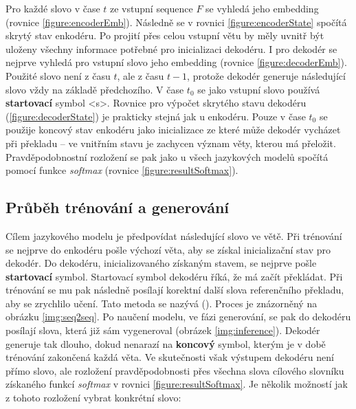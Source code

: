 Pro každé slovo v čase $t$ ze vstupní sequence $F$ se vyhledá jeho embedding (rovnice \ref{figure:encoderEmb}). Následně se v rovnici \ref{figure:encoderState} spočítá skrytý stav enkodéru. Po projití přes celou vstupní větu by měly uvnitř být uloženy všechny informace potřebné pro inicializaci dekodéru. I pro dekodér se nejprve vyhledá pro vstupní slovo jeho embedding (rovnice \ref{figure:decoderEmb}). Použité slovo není z času $t$, ale z času $t-1$, protože dekodér generuje následující slovo vždy na základě předchozího. V čase $t_0$ se jako vstupní slovo používá \textbf{startovací} symbol <s>. Rovnice pro výpočet skrytého stavu dekodéru (\ref{figure:decoderState}) je prakticky stejná jak u enkodéru. Pouze v čase $t_0$ se použije koncový stav enkodéru jako inicializace ze které může dekodér vycházet při překladu -- ve vnitřním stavu je zachycen význam věty, kterou má přeložit. Pravděpodobnostní rozložení se pak jako u všech jazykových modelů spočítá pomocí funkce \emph{softmax} (rovnice \ref{figure:resultSoftmax}).


\subsection{Průběh trénování a generování}

Cílem jazykového modelu je předpovídat následující slovo ve větě. Při trénování se nejprve do enkodéru pošle výchozí věta, aby se získal inicializační stav pro dekodér. Do dekodéru, inicializovaného získaným stavem, se nejprve pošle \textbf{startovací} symbol. Startovací symbol dekodéru říká, že má začít překládat. Při trénování se mu pak následně posílají korektní další slova referenčního překladu, aby se zrychlilo učení. Tato metoda se nazývá \label{teacherForcing} (\cite{teacherForcing}). Proces je znázorněný na obrázku \ref{img:seq2seq}. Po naučení modelu, ve fázi generování, se pak do dekodéru posílají slova, která již sám vygeneroval (obrázek \ref{img:inference}). Dekodér generuje tak dlouho, dokud nenarazí na \textbf{koncový} symbol, kterým je v době trénování zakončená každá věta. Ve skutečnosti však výstupem dekodéru není přímo slovo, ale rozložení pravděpodobnosti přes všechna slova cílového slovníku získaného funkcí \emph{softmax} v rovnici \ref{figure:resultSoftmax}. Je několik možností jak z tohoto rozložení vybrat konkrétní slovo:

